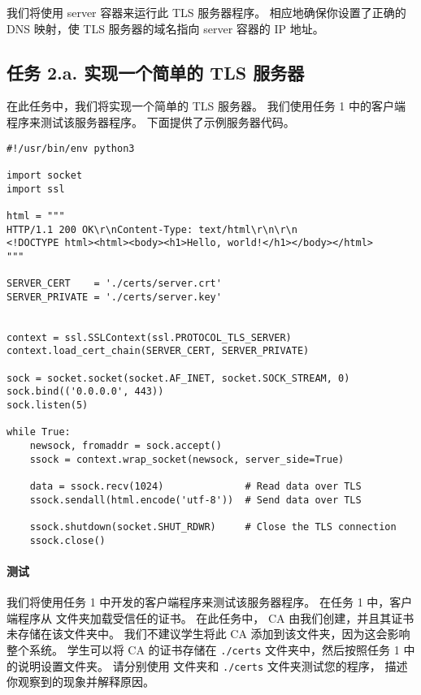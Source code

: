 我们将使用 server 容器来运行此 TLS 服务器程序。
相应地确保你设置了正确的 DNS 映射，使 TLS 服务器的域名指向 server 容器的 IP 地址。


\subsection{任务 2.a. 实现一个简单的 TLS 服务器}

在此任务中，我们将实现一个简单的 TLS 服务器。
我们使用任务 1 中的客户端程序来测试该服务器程序。
下面提供了示例服务器代码。

\begin{lstlisting}[caption={\texttt{server.py} (in \texttt{Labsetup/volumes})}, label={tls:server}]
#!/usr/bin/env python3

import socket
import ssl

html = """
HTTP/1.1 200 OK\r\nContent-Type: text/html\r\n\r\n
<!DOCTYPE html><html><body><h1>Hello, world!</h1></body></html>
"""

SERVER_CERT    = './certs/server.crt'
SERVER_PRIVATE = './certs/server.key'


context = ssl.SSLContext(ssl.PROTOCOL_TLS_SERVER)
context.load_cert_chain(SERVER_CERT, SERVER_PRIVATE)

sock = socket.socket(socket.AF_INET, socket.SOCK_STREAM, 0)
sock.bind(('0.0.0.0', 443))
sock.listen(5)

while True:
    newsock, fromaddr = sock.accept()
    ssock = context.wrap_socket(newsock, server_side=True)

    data = ssock.recv(1024)              # Read data over TLS
    ssock.sendall(html.encode('utf-8'))  # Send data over TLS

    ssock.shutdown(socket.SHUT_RDWR)     # Close the TLS connection
    ssock.close()
\end{lstlisting}



\paragraph{测试}
我们将使用任务 1 中开发的客户端程序来测试该服务器程序。
在任务 1 中，客户端程序从  文件夹加载受信任的证书。
在此任务中， CA 由我们创建，并且其证书未存储在该文件夹中。
我们不建议学生将此 CA 添加到该文件夹，因为这会影响整个系统。
学生可以将 CA 的证书存储在 \texttt{./certs} 文件夹中，然后按照任务 1 中的说明设置文件夹。
请分别使用  文件夹和 \texttt{./certs} 文件夹测试您的程序，
描述你观察到的现象并解释原因。

